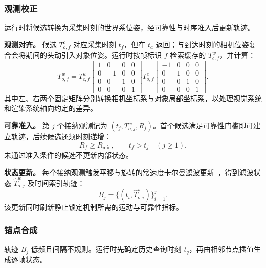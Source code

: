 \documentclass[review]{vgtc}
\begin{document}
\subsubsection{观测校正}\label{sec:obs-update}

运行时将候选转换为采集时刻的世界系位姿，经可靠性与时序准入后更新轨迹。

\textbf{观测对齐。}
候选 $T_{o,f}^{c}$ 对应采集时刻 $t_f$，但在 $t_a$ 返回；与到达时刻的相机位姿复合会将期间的头动引入对象位姿。运行时按帧标识 $f$ 检索缓存的 $T_{c,f}^{w}$，并计算：
\begin{equation}
T_{o,f}^{w} = T_{c,f}^{w}
\begin{bmatrix}
1 & 0 & 0 & 0 \\
0 & -1 & 0 & 0 \\
0 & 0 & 1 & 0 \\
0 & 0 & 0 & 1
\end{bmatrix}
T_{o,f}^{c}
\begin{bmatrix}
-1 & 0 & 0 & 0 \\
0 & 1 & 0 & 0 \\
0 & 0 & 1 & 0 \\
0 & 0 & 0 & 1
\end{bmatrix}.
\label{eq:capture-alignment}
\end{equation}
其中左、右两个固定矩阵分别转换相机坐标系与对象局部坐标系，以处理视觉系统和渲染系统轴向约定的差异。

\textbf{可靠准入。}
第 $j$ 个接纳观测记为 $(t_j,T_{o,j}^{w},R_j)$。首个候选满足可靠性门槛即可建立轨迹，后续候选还须时刻递增：
\begin{equation}
R_f \geq R_{\min}, \qquad t_f > t_j \quad (j \geq 1).
\label{eq:admission}
\end{equation}
未通过准入条件的候选不更新内部状态。

\textbf{状态更新。}
每个接纳观测触发平移与旋转的常速度卡尔曼滤波更新~\cite{kalman1960new}，得到滤波状态 $\widehat{T}_{o,j}^{w}$ 及时间索引轨迹：
\begin{equation}
B_j = \{(t_i, \widehat{T}_{o,i}^{w})\}_{i=1}^{j}.
\label{eq:trajectory}
\end{equation}
该更新同时刷新静止锁定机制所需的运动与可靠性指标。

\subsubsection{锚点合成}\label{sec:frame-output}

轨迹 $B_j$ 低频且间隔不规则。运行时先确定历史查询时刻 $t_q$，再由相邻节点插值生成逐帧状态。
\end{document}
